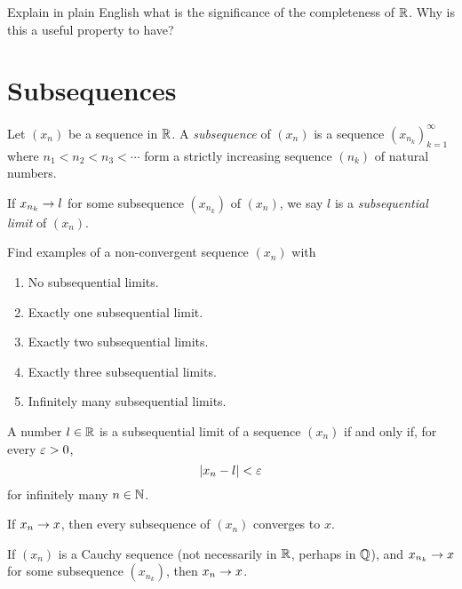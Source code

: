 \documentclass{book}
\begin{document}
\begin{expn}
Explain in plain English what is the significance of the completeness of $\mathbb{R}$. Why is this a useful property to have?
\label{Expn:completeness}
\end{expn}

\section{Subsequences} \label{S:subseqs}
\begin{defn}
Let $(x_n)$ be a sequence in $\mathbb{R}$. A {\em subsequence} of $(x_n)$ is a
sequence $(x_{n_k})_{k=1}^\infty$ where $n_1 < n_2 < n_3 <\cdots$ form a strictly
increasing sequence $(n_k)$ of natural numbers.

If $x_{n_k} \rightarrow l$ for some subsequence $(x_{n_k})$ of $(x_n)$, we say $l$ is a {\em subsequential limit} of
$(x_n)$. 
\label{D:subseq}
\end{defn}

\begin{ex}
Find examples of a non-convergent sequence $(x_n)$ with
\begin{enumerate}
\item No subsequential limits.
\item Exactly one subsequential limit.
\item Exactly two subsequential limits.
\item Exactly three subsequential limits.
\item Infinitely many subsequential limits.
\end{enumerate}
\label{X:subseq_limits}
\end{ex}

\begin{prop}
A number $l \in \mathbb{R}$ is a subsequential limit of a sequence $(x_n)$ if and only if, for
every $\varepsilon > 0$, 
\[
	\lvert x_n - l\rvert < \varepsilon
\]
for infinitely many $n \in \mathbb{N}$.
\label{P:subseq_limit}
\end{prop}

\begin{prop}
If $x_n \rightarrow x$, then every subsequence of $(x_n)$ converges to $x$. 
\label{P:every_subseq_converges}
\end{prop}

\begin{prop}
If $(x_n)$ is a Cauchy sequence (not necessarily in $\mathbb{R}$, perhaps in $\mathbb{Q}$), and $x_{n_k} \rightarrow x$ for some subsequence $(x_{n_k})$, then $x_n \rightarrow x$.
\label{P:cauchy_plus_subseq}
\end{prop}
\end{document}
